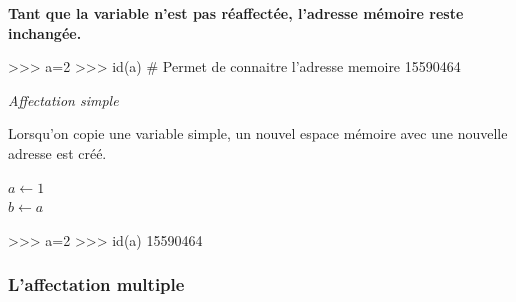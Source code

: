 \documentclass[10pt,fleqn]{article} %
\begin{document}
\textbf{Tant que la variable n'est pas réaffectée, l'adresse mémoire reste inchangée.}

\begin{rem}
\begin{minipage}[c]{.55\linewidth}
\begin{py}
\begin{python}
>>> a=2
>>> id(a) # Permet de connaitre l'adresse memoire
    15590464
\end{python}
\end{py}
\end{minipage}
\end{rem}




\begin{exemple}

\textit{Affectation simple}

Lorsqu'on copie une variable simple, un nouvel espace mémoire avec une nouvelle adresse est créé. 
\begin{minipage}[c]{.45\linewidth}
\begin{pseudo}
\begin{algorithm}[H]
$a \gets 1$ \\
$b \gets a$ \\
\end{algorithm}
\end{pseudo}
\end{minipage}\hfill
\begin{minipage}[c]{.45\linewidth}
\begin{py}
\begin{python}
>>> a=2
>>> id(a) 
    15590464
\end{python}
\end{py}
\end{minipage}%

\end{exemple}

\subsubsection{L'affectation multiple}
\end{document}
